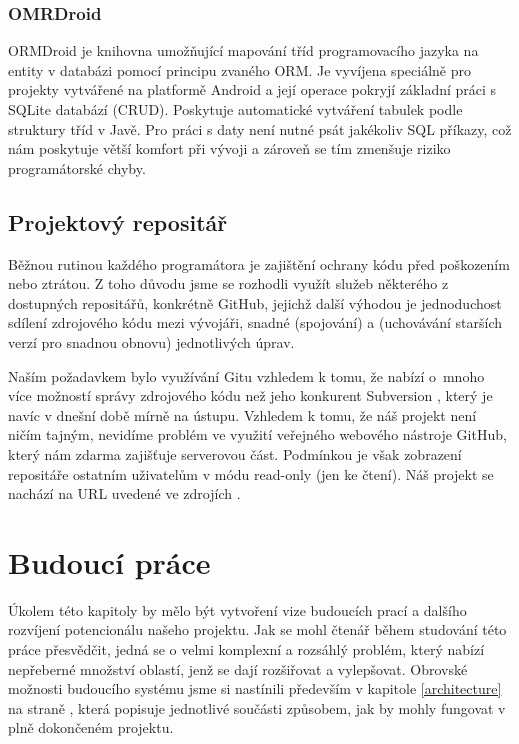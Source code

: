 \documentclass[thesis=M,czech]{FITthesis}[2012/06/26]
\begin{document}
\subsection{OMRDroid}\label{ormdroid}
ORMDroid je knihovna umožňující mapování tříd programovacího jazyka na entity v databázi pomocí principu zvaného ORM. Je vyvíjena speciálně pro projekty vytvářené na platformě Android a její operace pokryjí základní práci s SQLite databází (CRUD). Poskytuje automatické vytváření tabulek podle struktury tříd v Javě. Pro práci s daty není nutné psát jakékoliv SQL příkazy, což nám poskytuje větší komfort při vývoji a zároveň se tím zmenšuje riziko programátorské chyby.

\section{Projektový repositář}
Běžnou rutinou každého programátora je zajištění ochrany kódu před poškozením nebo ztrátou. Z toho důvodu jsme se rozhodli využít služeb některého z dostupných repositářů, konkrétně GitHub\cite{github}, jejichž další výhodou je jednoduchost sdílení zdrojového kódu mezi vývojáři, snadné  (spojování) a  (uchovávání starších verzí pro snadnou obnovu) jednotlivých úprav.

Naším požadavkem bylo využívání Gitu\cite{git} vzhledem k tomu, že nabízí o~mnoho více možností správy zdrojového kódu než jeho konkurent Subversion \cite{svn}, který je navíc v dnešní době mírně na ústupu. Vzhledem k tomu, že náš projekt není ničím tajným, nevidíme problém ve využití veřejného webového nástroje GitHub\cite{github}, který nám zdarma zajišťuje serverovou část. Podmínkou je však zobrazení repositáře ostatním uživatelům v módu read-only (jen ke čtení). Náš projekt se nachází na URL uvedené ve zdrojích \cite{github_project}.

\chapter{Budoucí práce}
Úkolem této kapitoly by mělo být vytvoření vize budoucích prací a dalšího rozvíjení potencionálu našeho projektu. Jak se mohl čtenář během studování této práce přesvědčit, jedná se o velmi komplexní a rozsáhlý problém, který nabízí nepřeberné množství oblastí, jenž se dají rozšiřovat a vylepšovat. Obrovské možnosti budoucího systému jsme si nastínili především v kapitole \ref{architecture} na straně \pageref{architecture}, která popisuje jednotlivé součásti způsobem, jak by mohly fungovat v plně dokončeném projektu.
\end{document}
